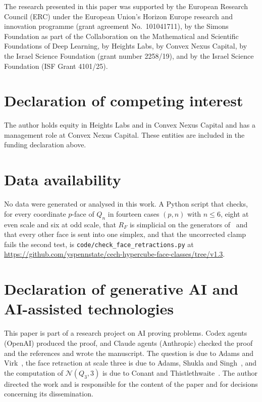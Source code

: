 \documentclass[11pt]{amsart}
\theoremstyle{remark}
\newcommand{\N}{\mathcal{N}}
\begin{document}
The research presented in this paper was supported by the European Research Council (ERC) under the European Union's
Horizon Europe research and innovation programme (grant agreement No.~101041711), by the Simons Foundation as part of
the Collaboration on the Mathematical and Scientific Foundations of Deep Learning, by Heights Labs, by Convex Nexus
Capital, by the Israel Science Foundation (grant number 2258/19), and by the Israel Science Foundation (ISF Grant
4101/25).

\section*{Declaration of competing interest}
The author holds equity in Heights Labs and in Convex Nexus Capital and has a management role at Convex Nexus Capital.
These entities are included in the funding declaration above.

\section*{Data availability}
No data were generated or analysed in this work. A Python script that checks, for every coordinate $p$-face of $Q_n$
in fourteen cases $(p,n)$ with $n\le6$, eight at even scale and six at odd scale, that $R_F$ is simplicial on the
generators of~\cite[Lemma~2.2]{ASS} and that every other face is sent into one simplex, and that the uncorrected clamp
fails the second test, is \texttt{code/check\_face\_retractions.py} at
\url{https://github.com/yspennstate/cech-hypercube-face-classes/tree/v1.3}.

\section*{Declaration of generative AI and AI-assisted technologies}
This paper is part of a research project on AI proving problems. Codex agents (OpenAI) produced the proof, and Claude
agents (Anthropic) checked the proof and the references and wrote the manuscript. The question is due to Adams and
Virk~\cite{AV}, the face retraction at scale three is due to Adams, Shukla and Singh~\cite{ASS}, and the computation
of $\N(Q_3,3)$ is due to Conant and Thistlethwaite~\cite{CT}. The author directed the work and is responsible for the
content of the paper and for decisions concerning its dissemination.
\end{document}
